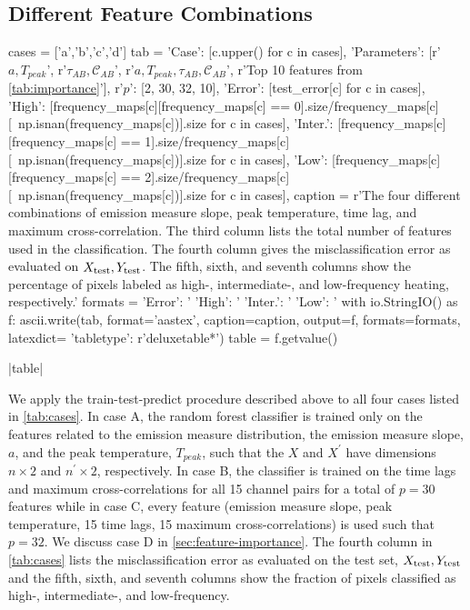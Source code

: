 \subsection{Different Feature Combinations}\label{sec:feature-combos}

\begin{pycode}[manager_ml]
cases = ['a','b','c','d']
tab = {
    'Case': [c.upper() for c in cases],
    'Parameters': [r'$a,T_{peak}$', r'$\tau_{AB},\mathcal{C}_{AB}$', r'$a,T_{peak},\tau_{AB},\mathcal{C}_{AB}$', r'Top 10 features from \autoref{tab:importance}'],
    r'$p$': [2, 30, 32, 10],
    'Error': [test_error[c] for c in cases],
    'High': [frequency_maps[c][frequency_maps[c] == 0].size/frequency_maps[c][~np.isnan(frequency_maps[c])].size for c in cases],
    'Inter.': [frequency_maps[c][frequency_maps[c] == 1].size/frequency_maps[c][~np.isnan(frequency_maps[c])].size for c in cases],
    'Low': [frequency_maps[c][frequency_maps[c] == 2].size/frequency_maps[c][~np.isnan(frequency_maps[c])].size for c in cases],
}
caption = r'The four different combinations of emission measure slope, peak temperature, time lag, and maximum cross-correlation. The third column lists the total number of features used in the classification. The fourth column gives the misclassification error as evaluated on $X_\textup{test},Y_\textup{test}$. The fifth, sixth, and seventh columns show the percentage of pixels labeled as high-, intermediate-, and low-frequency heating, respectively.\label{tab:cases}'
formats = {
    'Error': '%
    'High': '%
    'Inter.': '%
    'Low': '%
}
with io.StringIO() as f:
    ascii.write(tab, format='aastex', caption=caption, output=f, formats=formats, latexdict={ 'tabletype': r'deluxetable*'})
    table = f.getvalue()
\end{pycode}
\py[manager_ml]|table|

We apply the train-test-predict procedure described above to all four cases listed in \autoref{tab:cases}.
In case A, the random forest classifier is trained only on the features related to the emission measure distribution, the emission measure slope, $a$, and the peak temperature, $T_{peak}$, such that the $X$ and $X^\prime$ have dimensions $n\times2$ and $n^\prime\times2$, respectively.
In case B, the classifier is trained on the time lags and maximum cross-correlations for all 15 channel pairs for a total of $p=30$ features while in case C, every feature (emission measure slope, peak temperature, 15 time lags, 15 maximum cross-correlations) is used such that $p=32$.
We discuss case D in \autoref{sec:feature-importance}.
The fourth column in \autoref{tab:cases} lists the misclassification error as evaluated on the test set, $X_\textup{test},Y_\textup{test}$ and the fifth, sixth, and seventh columns show the fraction of pixels classified as high-, intermediate-, and low-frequency.


